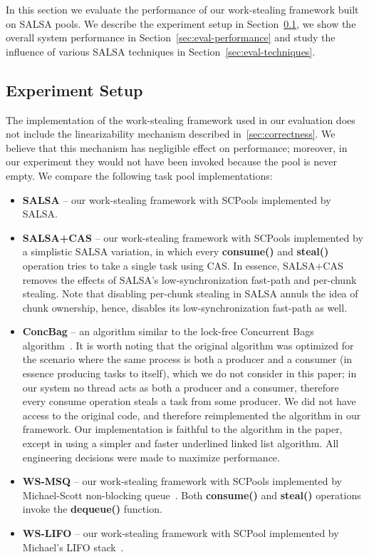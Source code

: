 In this section we evaluate the performance of our work-stealing framework built on SALSA pools. 
We describe the experiment setup in Section~\ref{sec:exp-setup}, we show the overall system performance in Section~\ref{sec:eval-performance} and study the influence of various SALSA techniques in Section~\ref{sec:eval-techniques}.

\subsection {Experiment Setup}
\label{sec:exp-setup}
The implementation of the work-stealing framework used in our evaluation does not include the linearizability mechanism described in~\ref{sec:correctness}. We believe that this mechanism has negligible effect on performance; moreover, in our experiment they would not have been invoked because the pool is never empty. We compare the following task pool implementations:
\begin {itemize}
\item
{\bf SALSA} -- our work-stealing framework with SCPools implemented by SALSA.
\item
{\bf SALSA+CAS} -- our work-stealing framework with SCPools implemented by a simplistic SALSA variation, in which every {\bf consume()} and {\bf steal()} operation tries to take a single task using CAS. In essence, SALSA+CAS removes the effects of SALSA's low-synchronization fast-path and per-chunk stealing. 
Note that disabling per-chunk stealing in SALSA annuls the idea of chunk ownership, hence, disables its low-synchronization fast-path as well. 
\item
{\bf ConcBag} -- an algorithm similar to the lock-free Concurrent Bags algorithm~\cite{Sundell:2011:LAC:1989493.1989550}. 
It is worth noting that the original algorithm was optimized for the scenario where the same process is both a producer and a consumer (in essence producing tasks to itself), which we do not consider in this paper; in our system no thread acts as both a producer and a consumer, therefore every consume operation steals a task from some producer.
We did not have access to the original code, and therefore reimplemented the algorithm in our framework. Our implementation is faithful to the algorithm in the paper, except in using a simpler and faster underlined linked list algorithm. All engineering decisions were made to maximize performance. 
\item
{\bf WS-MSQ} -- our work-stealing framework with SCPools implemented by Michael-Scott non-blocking queue~\cite{Michael:1996:SFP:248052.248106}. Both {\bf consume()} and {\bf steal()} operations invoke the {\bf dequeue()} function. 
\item
{\bf WS-LIFO} -- our work-stealing framework with SCPool implemented by Michael's LIFO stack~\cite{Michael:2004:HPS:987524.987595}. 
\end {itemize} 

